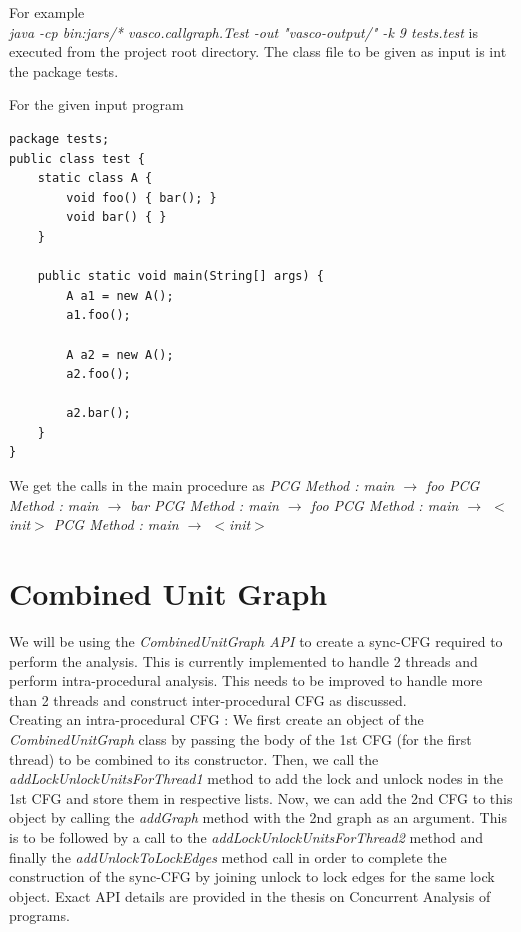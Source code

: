 For example \\
 \emph{java -cp bin:jars/* vasco.callgraph.Test  -out "vasco-output/" -k 9 tests.test} \newline 
 is executed from the project root directory. The class file to be given as input is int the package tests.
 
For the given input program  
\begin{lstlisting}
package tests;
public class test {
	static class A {
		void foo() { bar(); }
		void bar() { }
	}

	public static void main(String[] args) {
		A a1 = new A();
		a1.foo();

		A a2 = new A();
		a2.foo();

		a2.bar();
	}
}
\end{lstlisting} 

We get the calls in the main procedure as \newline
\emph{
	PCG Method : main $\rightarrow$ foo \newline
	PCG Method : main $\rightarrow$ bar \newline
	PCG Method : main $\rightarrow$ foo \newline
	PCG Method : main $\rightarrow$ $<$init$>$ \newline
	PCG Method : main $\rightarrow$ $<$init$>$ \newline
	}

\section{Combined Unit Graph}

We will be using the \emph{CombinedUnitGraph API} to create a sync-CFG required to perform the analysis. This is currently implemented to handle 2 threads and perform intra-procedural analysis. This needs to be improved to handle more than 2 threads and construct inter-procedural CFG as discussed. \\

Creating an intra-procedural CFG :  We first create an object of the \emph{CombinedUnitGraph} class by passing the body of the 1st CFG (for the first thread) to be combined to its constructor. Then, we call the \emph{addLockUnlockUnitsForThread1} 
method to add the lock and unlock nodes in the 1st CFG and store them in respective lists. Now, we
can add the 2nd CFG to this object by calling the \emph{addGraph} method with the 2nd graph
as an argument. This is to be followed by a call to the \emph{addLockUnlockUnitsForThread2} method and finally the \emph{addUnlockToLockEdges} method call in order to complete the construction of the sync-CFG by joining unlock to lock edges for the same lock object. Exact API details are provided in the thesis on Concurrent Analysis of programs.\cite*{btpreport} \\


